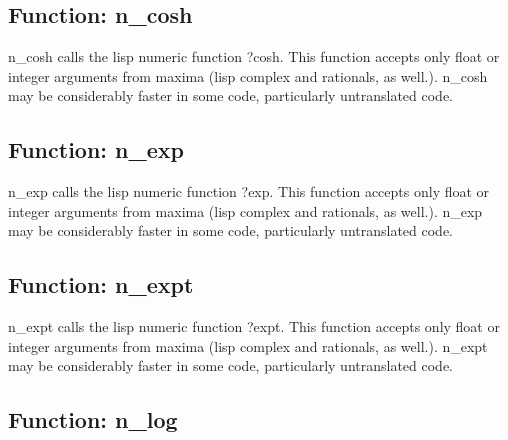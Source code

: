 \documentclass[]{article}
\begin{document}
\vspace{5 pt}


\subsection{Function: n\_cosh\label{sec:n_cosh}}
\hypertarget{n_cosh}{}



\vspace{5 pt}
n\_cosh calls the lisp numeric function ?cosh. This function accepts only float or integer arguments from maxima (lisp complex and rationals, as well.). n\_cosh may be considerably faster in some code, particularly untranslated code. 

\vspace{5 pt}


\subsection{Function: n\_exp\label{sec:n_exp}}
\hypertarget{n_exp}{}



\vspace{5 pt}
n\_exp calls the lisp numeric function ?exp. This function accepts only float or integer arguments from maxima (lisp complex and rationals, as well.). n\_exp may be considerably faster in some code, particularly untranslated code. 

\vspace{5 pt}


\subsection{Function: n\_expt\label{sec:n_expt}}
\hypertarget{n_expt}{}



\vspace{5 pt}
n\_expt calls the lisp numeric function ?expt. This function accepts only float or integer arguments from maxima (lisp complex and rationals, as well.). n\_expt may be considerably faster in some code, particularly untranslated code. 

\vspace{5 pt}


\subsection{Function: n\_log\label{sec:n_log}}
\hypertarget{n_log}{}
\end{document}
